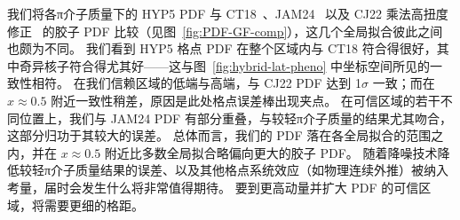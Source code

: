 我们将各π介子质量下的 HYP5 PDF 与 CT18~\cite{Hou:2019efy}、JAM24~\cite{Anderson:2024evk} 以及 CJ22 乘法高扭度修正~\cite{Cerutti:2025yji} 的胶子 PDF 比较（见图~\ref{fig:PDF-GF-comp}），这几个全局拟合彼此之间也颇为不同。
我们看到 HYP5 格点 PDF 在整个区域内与 CT18 符合得很好，其中奇异核子符合得尤其好——这与图~\ref{fig:hybrid-lat-pheno} 中坐标空间所见的一致性相符。
在我们信赖区域的低端与高端，与 CJ22 PDF 达到 1$\sigma$ 一致；而在 $x\approx 0.5$ 附近一致性稍差，原因是此处格点误差棒出现夹点。
在可信区域的若干不同位置上，我们与 JAM24 PDF 有部分重叠，与较轻π介子质量的结果尤其吻合，这部分归功于其较大的误差。
总体而言，我们的 PDF 落在各全局拟合的范围之内，并在 $x\approx 0.5$ 附近比多数全局拟合略偏向更大的胶子 PDF。
随着降噪技术降低较轻π介子质量结果的误差、以及其他格点系统效应（如物理连续外推）被纳入考量，届时会发生什么将非常值得期待。
要到更高动量并扩大 PDF 的可信区域，将需要更细的格距。

